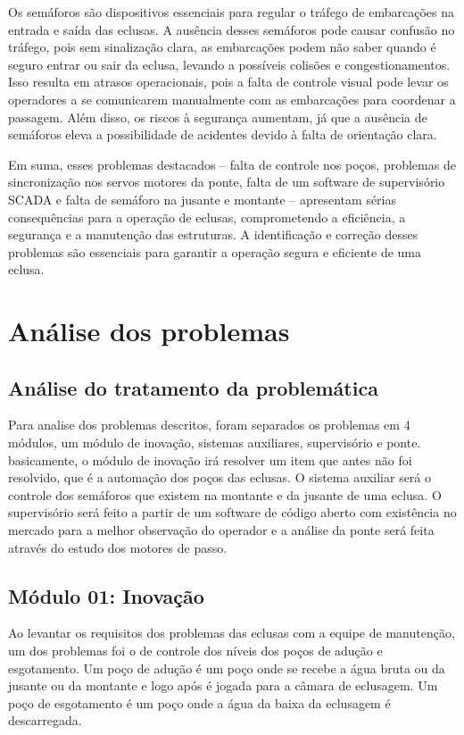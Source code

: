 Os semáforos são dispositivos essenciais para regular o tráfego de embarcações na entrada e saída das eclusas. A ausência desses semáforos pode causar confusão no tráfego, pois sem sinalização clara, as embarcações podem não saber quando é seguro entrar ou sair da eclusa, levando a possíveis colisões e congestionamentos. Isso resulta em atrasos operacionais, pois a falta de controle visual pode levar os operadores a se comunicarem manualmente com as embarcações para coordenar a passagem. Além disso, os riscos à segurança aumentam, já que a ausência de semáforos eleva a possibilidade de acidentes devido à falta de orientação clara.

Em suma, esses problemas destacados – falta de controle nos poços, problemas de sincronização nos servos motores da ponte, falta de um software de supervisório SCADA e falta de semáforo na jusante e montante – apresentam sérias consequências para a operação de eclusas, comprometendo a eficiência, a segurança e a manutenção das estruturas. A identificação e correção desses problemas são essenciais para garantir a operação segura e eficiente de uma eclusa.

\section{Análise dos problemas}

\subsection{Análise do tratamento da problemática}

Para analise dos problemas descritos, foram separados os problemas em 4 módulos, um módulo de inovação, sistemas auxiliares, supervisório e ponte. basicamente, o módulo de inovação irá resolver um item que antes não foi resolvido, que é a automação dos poços das eclusas. O sistema auxiliar será o controle dos semáforos que existem na montante e da jusante de uma eclusa. O supervisório será feito a partir de um software de código aberto com existência no mercado para a melhor observação do operador e a análise da ponte será feita através do estudo dos motores de passo.

\subsection{Módulo 01: Inovação}

Ao levantar os requisitos dos problemas das eclusas com a equipe de manutenção, um dos problemas foi o de controle dos níveis dos poços de adução e esgotamento. Um poço de adução é um poço onde se recebe a água bruta ou da jusante ou da montante e logo após é jogada para a câmara de eclusagem. Um poço de esgotamento é um poço onde a água da baixa da eclusagem é descarregada. 

